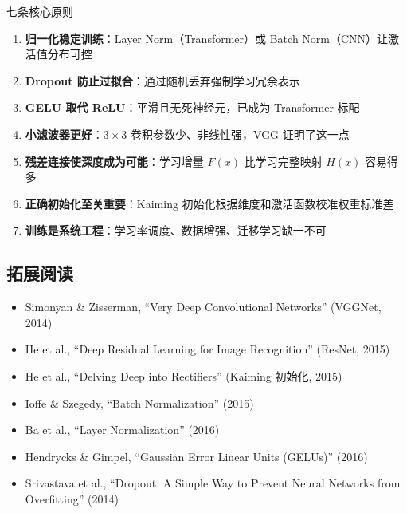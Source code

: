 \documentclass[a4paper]{article}
\begin{document}
\begin{importantbox}{七条核心原则}
\begin{enumerate}
    \item \textbf{归一化稳定训练}：Layer Norm（Transformer）或 Batch Norm（CNN）让激活值分布可控
    \item \textbf{Dropout 防止过拟合}：通过随机丢弃强制学习冗余表示
    \item \textbf{GELU 取代 ReLU}：平滑且无死神经元，已成为 Transformer 标配
    \item \textbf{小滤波器更好}：$3 \times 3$ 卷积参数少、非线性强，VGG 证明了这一点
    \item \textbf{残差连接使深度成为可能}：学习增量 $F(x)$ 比学习完整映射 $H(x)$ 容易得多
    \item \textbf{正确初始化至关重要}：Kaiming 初始化根据维度和激活函数校准权重标准差
    \item \textbf{训练是系统工程}：学习率调度、数据增强、迁移学习缺一不可
\end{enumerate}
\end{importantbox}

\subsection{拓展阅读}

\begin{itemize}
    \item Simonyan \& Zisserman, ``Very Deep Convolutional Networks'' (VGGNet, 2014)
    \item He et al., ``Deep Residual Learning for Image Recognition'' (ResNet, 2015)
    \item He et al., ``Delving Deep into Rectifiers'' (Kaiming 初始化, 2015)
    \item Ioffe \& Szegedy, ``Batch Normalization'' (2015)
    \item Ba et al., ``Layer Normalization'' (2016)
    \item Hendrycks \& Gimpel, ``Gaussian Error Linear Units (GELUs)'' (2016)
    \item Srivastava et al., ``Dropout: A Simple Way to Prevent Neural Networks from Overfitting'' (2014)
\end{itemize}
\end{document}
